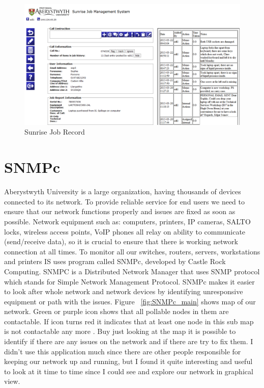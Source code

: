 \documentclass[10pt,a4paper,headinclude=true]{report}
\begin{document}
\begin{figure}[H]
\centering
\centerline{\includegraphics[scale=0.5]{./sunrise_job}}
\caption{Sunrise Job Record}
\label{fig:sunrise_job}
\end{figure}

\section{SNMPc}
Aberystwyth University is a large organization, having thousands of devices connected to its network. To provide reliable service for end users we need to ensure that our network functions properly and issues are fixed as soon as possible. Network equipment such as: computers, printers, IP cameras, SALTO locks, wireless access points, VoIP phones all relay on ability to communicate (send/receive data), so it is crucial to ensure that there is working network connection at all times.  To monitor all our switches, routers, servers, workstations and printers IS uses program called SNMPc, developed by Castle Rock Computing. SNMPC is a Distributed Network Manager \cite{SNMPc}
that uses SNMP protocol which stands for Simple Network Management Protocol. SNMPc makes it easier to look after whole network and network devices by identifying unresponsive equipment or path with the issues. Figure ~\ref{fig:SNMPc_main} shows map of our network. Green or purple icon shows that all pollable nodes in them are contactable. If icon turns red it indicates that at least one node in this sub map is not contactable any more \cite{SNPMcSharePoint}. Buy just looking at the map it is possible to identify if there are any issues on the network and if there are try to fix them. I didn't use this application much since there are other people responsible for keeping our network up and running, but I found it quite interesting and useful to look at it time to time since I could see and explore our network in graphical view.
\end{document}
